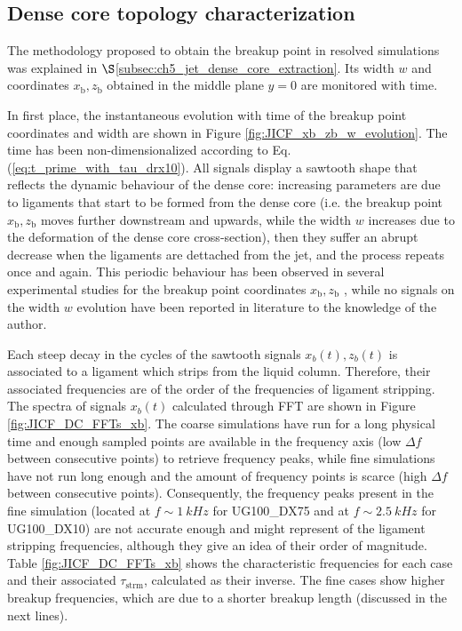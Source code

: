 \subsection{Dense core topology characterization}
\label{subsec:ch5_DC_topology_characterization}

The methodology proposed to obtain the breakup point in resolved simulations was explained in $\S$\ref{subsec:ch5_jet_dense_core_extraction}. Its width $w$ and coordinates $x_\mathrm{b}, z_\mathrm{b}$ obtained in the middle plane $y = 0$ are monitored with time. 

In first place, the instantaneous evolution with time of the breakup point coordinates and width are shown in Figure \ref{fig:JICF_xb_zb_w_evolution}. The time has been non-dimensionalized according to Eq. (\ref{eq:t_prime_with_tau_drx10}). All signals display a sawtooth shape that reflects the dynamic behaviour of the dense core: increasing parameters are due to ligaments that start to be formed from the dense core (i.e. the breakup point $x_\mathrm{b}, z_\mathrm{b}$ moves further downstream and upwards, while the width $w$ increases due to the deformation of the dense core cross-section), then they suffer an abrupt decrease when the ligaments are dettached from the jet, and the process repeats once and again.  This periodic behaviour has been observed in several experimental studies for the breakup point coordinates $x_\mathrm{b}, z_\mathrm{b}$ , while no signals on the width $w$ evolution have been reported in literature to the knowledge of the author.


Each steep decay in the cycles of the sawtooth signals $x_b (t), z_b (t)$ is associated to a ligament which strips from the liquid column. Therefore, their associated frequencies are of the order of the frequencies of ligament stripping. The spectra of signals $x_b (t)$ calculated through FFT are shown in Figure \ref{fig:JICF_DC_FFTs_xb}. The coarse simulations have run for a long physical time and enough sampled points are available in the frequency axis (low $\Delta f$ between consecutive points) to retrieve frequency peaks, while fine simulations have not run long enough and the amount of frequency points is scarce (high $\Delta f$ between consecutive points). Consequently, the frequency peaks present in the fine simulation (located at $f \sim 1~kHz$ for UG100\_DX75 and at $f \sim 2.5~kHz$ for UG100\_DX10) are not accurate enough and might represent of the ligament stripping frequencies, although they give an idea of their order of magnitude. Table \ref{fig:JICF_DC_FFTs_xb} shows the characteristic frequencies for each case and their associated $\tau_\mathrm{strm}$, calculated as their inverse. The fine cases show higher breakup frequencies, which are due to a shorter breakup length (discussed in the next lines). 

